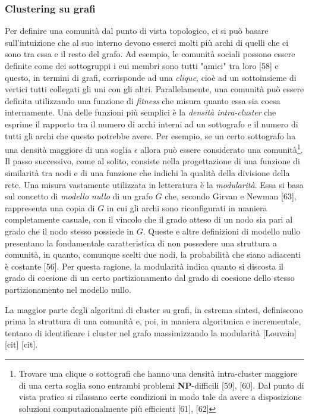 \subsubsection{Clustering su grafi}
Per definire una comunit\`a dal punto di vista topologico, ci si pu\`o basare sull'intuizione che al suo interno devono esserci molti pi\`u archi di quelli che ci sono tra essa e il resto del grafo. Ad esempio, le comunit\`a sociali possono essere definite come dei sottogruppi i cui membri sono tutti "amici" tra loro [58] e questo, in termini di grafi, corrisponde ad una \textit{clique}, cio\`e ad un sottoinsieme di vertici tutti collegati gli uni con gli altri. Parallelamente, una comunit\`a pu\`o essere definita utilizzando una funzione di \textit{fitness} che misura quanto essa sia coesa internamente. Una delle funzioni pi\`u semplici \`e la \textit{densit\`a intra-cluster} che esprime il rapporto tra il numero di archi interni ad un sottografo e il numero di tutti gli archi che questo potrebbe avere. Per esempio, se un certo sottografo ha una densit\`a maggiore di una soglia $ \epsilon $ allora pu\`o essere considerato una comunit\`a\footnote{Trovare una clique o sottografi che hanno una densit\`a intra-cluster maggiore di una certa soglia sono entrambi problemi \textbf{NP}-difficili [59], [60]. Dal punto di vista pratico si rilassano certe condizioni in modo tale da avere a disposizione soluzioni computazionalmente pi\`u efficienti [61], [62]}. 
Il passo successivo, come al solito, consiste nella progettazione di una funzione di similarit\`a tra nodi e di una funzione che indichi la qualit\`a della divisione della rete. Una misura vastamente utilizzata in letteratura \`e la \textit{modularit\`a}. Essa si basa sul concetto di \textit{modello nullo} di un grafo $ G $ che, secondo Girvan e Newman [63], rappresenta una copia di $ G $ in cui gli archi sono riconfigurati in maniera completamente casuale, con il vincolo che il grado atteso di un nodo sia pari al grado che il nodo stesso possiede in $ G $. Queste e altre definizioni di modello nullo presentano la fondamentale caratteristica di non possedere una struttura a comunit\`a, in quanto, comunque scelti due nodi, la probabilit\`a che siano adiacenti \`e costante [56]. Per questa ragione, la modularit\`a indica quanto si discosta il grado di coesione di un certo partizionamento dal grado di coesione dello stesso partizionamento nel modello nullo.

La maggior parte degli algoritmi di cluster su grafi, in estrema sintesi, definiscono prima la struttura di una comunit\`a e, poi, in maniera algoritmica e incrementale, tentano di identificare i cluster nel grafo massimizzando la modularit\`a [Louvain] [cit] [cit].

